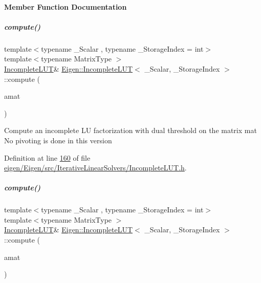 \paragraph{Member Function Documentation}
\mbox{\label{group___iterative_linear_solvers___module_a488e37ab51d8ed37a297eeca521f1817}} 
\subparagraph{\texorpdfstring{compute()}{compute()}\hspace{0.1cm}{\footnotesize\ttfamily [1/2]}}
{\footnotesize\ttfamily template$<$typename \+\_\+\+Scalar , typename \+\_\+\+Storage\+Index  = int$>$ \\
template$<$typename Matrix\+Type $>$ \\
\hyperlink{group___iterative_linear_solvers___module_class_eigen_1_1_incomplete_l_u_t}{Incomplete\+L\+UT}\& \hyperlink{group___iterative_linear_solvers___module_class_eigen_1_1_incomplete_l_u_t}{Eigen\+::\+Incomplete\+L\+UT}$<$ \+\_\+\+Scalar, \+\_\+\+Storage\+Index $>$\+::compute (\begin{DoxyParamCaption}\item[{const Matrix\+Type \&}]{amat }\end{DoxyParamCaption})\hspace{0.3cm}{\ttfamily [inline]}}

Compute an incomplete LU factorization with dual threshold on the matrix mat No pivoting is done in this version 

Definition at line \hyperlink{eigen_2_eigen_2src_2_iterative_linear_solvers_2_incomplete_l_u_t_8h_source_l00160}{160} of file \hyperlink{eigen_2_eigen_2src_2_iterative_linear_solvers_2_incomplete_l_u_t_8h_source}{eigen/\+Eigen/src/\+Iterative\+Linear\+Solvers/\+Incomplete\+L\+U\+T.\+h}.

\mbox{\label{group___iterative_linear_solvers___module_a488e37ab51d8ed37a297eeca521f1817}} 
\subparagraph{\texorpdfstring{compute()}{compute()}\hspace{0.1cm}{\footnotesize\ttfamily [2/2]}}
{\footnotesize\ttfamily template$<$typename \+\_\+\+Scalar , typename \+\_\+\+Storage\+Index  = int$>$ \\
template$<$typename Matrix\+Type $>$ \\
\hyperlink{group___iterative_linear_solvers___module_class_eigen_1_1_incomplete_l_u_t}{Incomplete\+L\+UT}\& \hyperlink{group___iterative_linear_solvers___module_class_eigen_1_1_incomplete_l_u_t}{Eigen\+::\+Incomplete\+L\+UT}$<$ \+\_\+\+Scalar, \+\_\+\+Storage\+Index $>$\+::compute (\begin{DoxyParamCaption}\item[{const Matrix\+Type \&}]{amat }\end{DoxyParamCaption})\hspace{0.3cm}{\ttfamily [inline]}}

